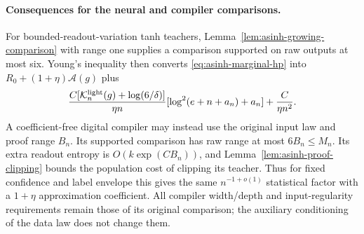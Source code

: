 \paragraph{Consequences for the neural and compiler comparisons.}
For bounded-readout-variation tanh teachers,
Lemma~\ref{lem:asinh-growing-comparison} with range one supplies a
comparison supported on raw outputs at most six. Young's inequality
then converts \eqref{eq:asinh-marginal-hp} into
$R_0+(1+\eta)\mathcal A(g)$ plus
\[
 \frac{C[\mathcal K_n^{\rm light}(g)+\log(6/\delta)]}{\eta n}
       [\log^2(e+n+a_n)+a_n]+\frac{C}{\eta n^2}.
\]
A coefficient-free digital compiler may instead use the original input
law and proof range $B_n$. Its supported comparison has raw range at
most $6B_n\le M_n$. Its extra readout entropy is
$O(k\exp(CB_n))$, and
Lemma~\ref{lem:asinh-proof-clipping} bounds the population cost of
clipping its teacher. Thus for fixed confidence and label envelope
this gives the same $n^{-1+o(1)}$ statistical factor with a
$1+\eta$ approximation coefficient. All compiler width/depth and
input-regularity requirements remain those of its original comparison;
the auxiliary conditioning of the data law does not change them.
